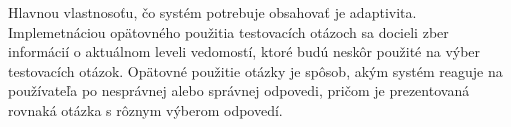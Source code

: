 \documentclass[10pt,twoside,slovak,a4paper]{article}
\begin{document}
Hlavnou vlastnosoťu, čo systém potrebuje obsahovať je adaptivita. Implemetnáciou opätovného použitia testovacích otázoch sa docieli zber informácií o aktuálnom leveli vedomostí, ktoré budú neskôr použité na výber testovacích otázok. Opätovné použitie otázky je spôsob, akým systém reaguje na používateľa po nesprávnej alebo správnej odpovedi, pričom je prezentovaná rovnaká otázka s rôznym výberom odpovedí.










\end{document}
